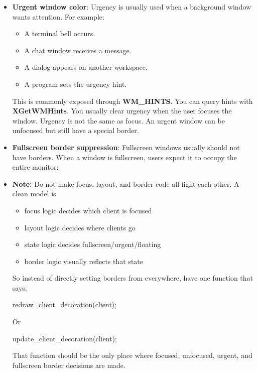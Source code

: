\documentclass{report}
\begin{document}
\begin{itemize}
            \bigbreak \noindent 
            Then, the total visible rectangle is 
            \bigbreak \noindent 
            \begin{cppcode}
                outer_width  = client_width  + 2 * border_width
                outer_height = client_height + 2 * border_width
            \end{cppcode}
        \item \textbf{Urgent window color}: Urgency is usually used when a background window wants attention. For example:
            \begin{itemize}
                \item A terminal bell occurs.
                \item A chat window receives a message.
                \item A dialog appears on another workspace.
                \item A program sets the urgency hint.
            \end{itemize}
            This is commonly exposed through \textbf{WM\_HINTS}. You can query hints with \textbf{XGetWMHints}. You usually clear urgency when the user focuses the window.
            \bigbreak \noindent 
            Urgency is not the same as focus. An urgent window can be unfocused but still have a special border.
        \item \textbf{Fullscreen border suppression}: Fullscreen windows usually should not have borders. When a window is fullscreen, users expect it to occupy the entire monitor:
        \item \textbf{Note:} Do not make focus, layout, and border code all fight each other. A clean model is 
            \begin{itemize}
                \item focus logic decides which client is focused
                \item layout logic decides where clients go
                \item state logic decides fullscreen/urgent/floating
                \item border logic visually reflects that state
            \end{itemize}
            So instead of directly setting borders from everywhere, have one function that says:
            \bigbreak \noindent 
            \begin{cppcode}
            redraw_client_decoration(client);
            \end{cppcode}
            \bigbreak \noindent 
            Or
            \bigbreak \noindent 
            \begin{cppcode}
            update_client_decoration(client);
            \end{cppcode}
            \bigbreak \noindent 
            That function should be the only place where focused, unfocused, urgent, and fullscreen border decisions are made.


    \end{itemize}
\end{document}
